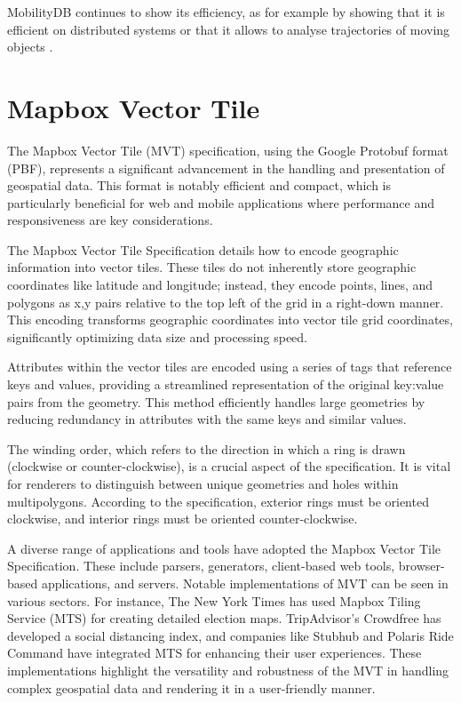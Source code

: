 \documentclass[12pt]{report}
\begin{document}
	MobilityDB continues to show its efficiency, as for example by showing that it is efficient on distributed systems \cite{bakli2019distributed} or that it allows to analyse trajectories of moving objects \cite{rovinelli2021multiple}.
	
	\section{Mapbox Vector Tile}
	\label{sec:MVT}
	
	The Mapbox Vector Tile (MVT) specification, using the Google Protobuf format (PBF), represents a significant advancement in the handling and presentation of geospatial data. This format is notably efficient and compact, which is particularly beneficial for web and mobile applications where performance and responsiveness are key considerations.
	
	The Mapbox Vector Tile Specification details how to encode geographic information into vector tiles. These tiles do not inherently store geographic coordinates like latitude and longitude; instead, they encode points, lines, and polygons as x,y pairs relative to the top left of the grid in a right-down manner. This encoding transforms geographic coordinates into vector tile grid coordinates, significantly optimizing data size and processing speed.
	
	Attributes within the vector tiles are encoded using a series of tags that reference keys and values, providing a streamlined representation of the original key:value pairs from the geometry. This method efficiently handles large geometries by reducing redundancy in attributes with the same keys and similar values.
	
	The winding order, which refers to the direction in which a ring is drawn (clockwise or counter-clockwise), is a crucial aspect of the specification. It is vital for renderers to distinguish between unique geometries and holes within multipolygons. According to the specification, exterior rings must be oriented clockwise, and interior rings must be oriented counter-clockwise.
	
	A diverse range of applications and tools have adopted the Mapbox Vector Tile Specification. These include parsers, generators, client-based web tools, browser-based applications, and servers. Notable implementations of MVT can be seen in various sectors. For instance, The New York Times has used Mapbox Tiling Service (MTS) for creating detailed election maps. TripAdvisor’s Crowdfree has developed a social distancing index, and companies like Stubhub and Polaris Ride Command have integrated MTS for enhancing their user experiences. These implementations highlight the versatility and robustness of the MVT in handling complex geospatial data and rendering it in a user-friendly manner.
	
\end{document}
